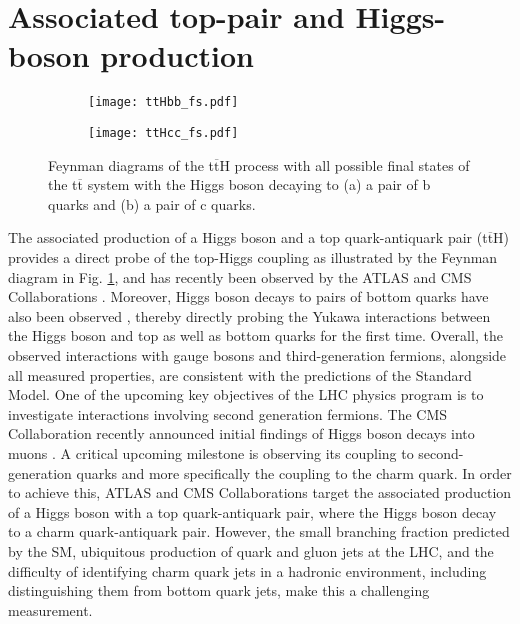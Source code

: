 \section{\label{intro_ttH}Associated top-pair and Higgs-boson production}
\begin{figure}[H]
    \centering
    \begin{subfigure}{0.45\textwidth}
        \texttt{[image: ttHbb\_fs.pdf]}
        \caption{}
    \end{subfigure}
    \begin{subfigure}{0.45\textwidth}
        \texttt{[image: ttHcc\_fs.pdf]}
        \caption{}
    \end{subfigure}
    \caption{Feynman diagrams of the t$\overline{\text{t}}$H process with all possible final states of the t$\overline{\text{t}}$ system  with the Higgs boson decaying to (a) a pair of b quarks and (b) a pair of c quarks.}
    \label{fig:ttH}
\end{figure}
\noindent The associated production of a Higgs boson and a top quark-antiquark pair (t$\overline{\text{t}}$H) provides a direct probe of the top-Higgs coupling as illustrated by the Feynman diagram in Fig. \ref{fig:ttH}, and has recently been observed by the ATLAS and CMS Collaborations \cite{ttH_1,ttH_2}. Moreover, Higgs boson decays to pairs of bottom quarks have also been observed \cite{ttH_3,ttH_4}, thereby directly probing the Yukawa interactions between the Higgs boson and top as well as bottom quarks for the first time. Overall, the observed interactions with gauge bosons and third-generation fermions, alongside all measured properties, are consistent with the predictions of the Standard Model. One of the upcoming key objectives of the LHC physics program is to investigate interactions involving second generation fermions. The CMS Collaboration recently announced initial findings of Higgs boson decays into muons \cite{Sirunyan_2021}. A critical upcoming milestone is observing its coupling to second-generation quarks and more specifically the coupling to the charm quark. In order to achieve this, ATLAS and CMS Collaborations target the associated production of a Higgs boson with a top quark-antiquark pair, where the Higgs boson decay to a charm quark-antiquark pair. However, the small branching fraction predicted by the SM, ubiquitous production of quark and gluon jets at the LHC, and the difficulty of identifying charm quark jets in a hadronic environment, including distinguishing them from bottom quark jets, make this a challenging measurement.

